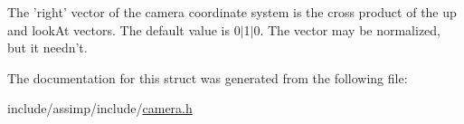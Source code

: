 The 'right' vector of the camera coordinate system is the cross product of the up and look\-At vectors. The default value is 0$|$1$|$0. The vector may be normalized, but it needn't. 

The documentation for this struct was generated from the following file\-:\begin{DoxyCompactItemize}
\item 
include/assimp/include/\hyperlink{include_2assimp_2include_2camera_8h}{camera.\-h}\end{DoxyCompactItemize}
